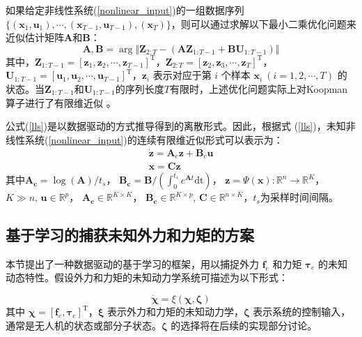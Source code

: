 \documentclass[lang=chs, degree=master, blindreview=false, winfonts=true]{yanputhesis}
\begin{document}
如果给定非线性系统(\ref{nonlinear_input})的一组数据序列 $\{(\bm{x}_1,\bm{u}_1),\cdots,(\bm{x}_{T-1},\bm{u}_{T-1}),(\bm{x}_T)\}$，则可以通过求解以下最小二乘优化问题来近似估计矩阵$\bm{A}$和$\bm{B}$：
\begin{equation}
	\bm{A},\bm{B} = \mathop{\arg\min\limits_{\bm{A},\bm{B}}} \Vert \bm{Z}_{2:T} - (\bm{A}\bm{Z}_{1:T-1}+\bm{B}\bm{U}_{1:T-1}) \Vert \label{LS_AB}
\end{equation} 
其中，$\bm{Z}_{1:T-1}= [ \bm{z}_1,\bm{z}_2,\cdots,\bm{z}_{T-1} ]^\mathrm{T}$，$\bm{Z}_{2:T}= [\bm{z}_2,\bm{z}_3,\cdots,\bm{z}_{T}]^\mathrm{T}$，$\bm{U}_{1:T-1}= [\bm{u}_1,\bm{u}_2,\cdots,\bm{u}_{T-1}]^\mathrm{T}$，$\bm{z}_i$ 表示对应于第 $i$ 个样本 $\bm{x}_i\ (i=1,2,\cdots,T)$ 的状态。当$\bm{Z}_{1:T-1}$和$\bm{U}_{1:T-1}$的序列长度$T$有限时，上述优化问题实际上对Koopman算子进行了有限维近似 \cite{Hao2024}。

公式(\ref{lls})是以数据驱动的方式推导得到的离散形式。因此，根据式 (\ref{lls})，未知非线性系统(\ref{nonlinear_input})的连续有限维近似形式可以表示为：
\begin{equation}
	\begin{gathered}\dot{\boldsymbol{z}}=\boldsymbol{A}_{c}\boldsymbol{z}+\boldsymbol{B}_{c}\boldsymbol{u}\\\boldsymbol{x}=\boldsymbol{C}\boldsymbol{z}\end{gathered}
	\label{lift_linear}
\end{equation}
其中$\bm{A_c}=\log(\bm{A})/t_s$， $\bm{B_c}=\bm{B}/(\int_{0}^{t_s}e^{\bm{A}t}\text{dt})$， $\bm{z} = {\Psi}(\bm{x}):\mathbb{R}^n \rightarrow \mathbb{R}^K$， $K\gg n$, $\bm{u}\in \mathbb{R}^p$， $\bm{A_c} \in \mathbb{R}^{K\times K}$，  $\bm{B_c} \in \mathbb{R}^{K\times p}$, $\bm{C} \in \mathbb{R}^{n\times K}$，$t_s$为采样时间间隔。

\subsection{基于学习的捕获未知外力和力矩的方案}
本节提出了一种数据驱动的基于学习的框架，用以捕捉外力 $\bm{f}_e$ 和力矩 $\bm{\tau}_e$ 的未知动态特性。假设外力和力矩的未知动力学系统可描述为以下形式：

\begin{equation}
	\dot{\bm \chi} = {\xi}(\bm \chi,\bm \zeta) \label{dynamics}
\end{equation}
其中 $\bm \chi = [ \bm f_e, \bm \tau_e]^\mathrm{T}$，$\bm{\xi}$ 表示外力和力矩的未知动力学，$\bm{\zeta}$ 表示系统的控制输入，通常是无人机的状态或部分子状态。$\bm{\zeta}$ 的选择将在后续的实现部分讨论。
\end{document}

